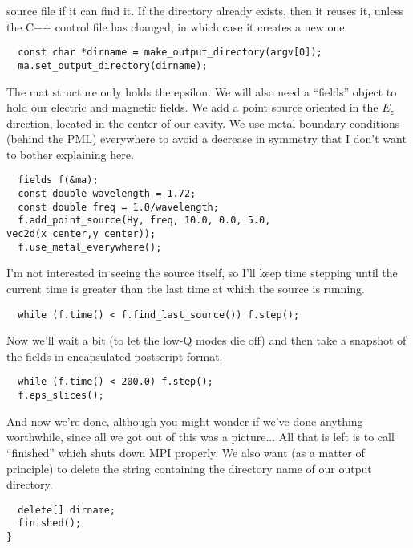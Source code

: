 source file if it can find it.  If the directory already exists, then it
reuses it, unless the C++ control file has changed, in which case it
creates a new one.
\begin{verbatim}
  const char *dirname = make_output_directory(argv[0]);
  ma.set_output_directory(dirname);
\end{verbatim}
The mat structure only holds the epsilon.  We will also need a ``fields''
object to hold our electric and magnetic fields.  We add a point source
oriented in the $E_z$ direction, located in the center of our cavity.  We
use metal boundary conditions (behind the PML) everywhere to avoid a
decrease in symmetry that I don't want to bother explaining here.
\begin{verbatim}
  fields f(&ma);
  const double wavelength = 1.72;
  const double freq = 1.0/wavelength;
  f.add_point_source(Hy, freq, 10.0, 0.0, 5.0, vec2d(x_center,y_center));
  f.use_metal_everywhere();
\end{verbatim}
I'm not interested in seeing the source itself, so I'll keep time stepping
until the current time is greater than the last time at which the source is
running.
\begin{verbatim}
  while (f.time() < f.find_last_source()) f.step();
\end{verbatim}
Now we'll wait a bit (to let the low-Q modes die off) and then take a
snapshot of the fields in encapsulated postscript format.
\begin{verbatim}
  while (f.time() < 200.0) f.step();
  f.eps_slices();
\end{verbatim}
And now we're done, although you might wonder if we've done anything
worthwhile, since all we got out of this was a picture... All that is left
is to call ``finished'' which shuts down MPI properly.  We also want (as a
matter of principle) to delete the string containing the directory name of
our output directory.
\begin{verbatim}
  delete[] dirname;
  finished();
}
\end{verbatim}
